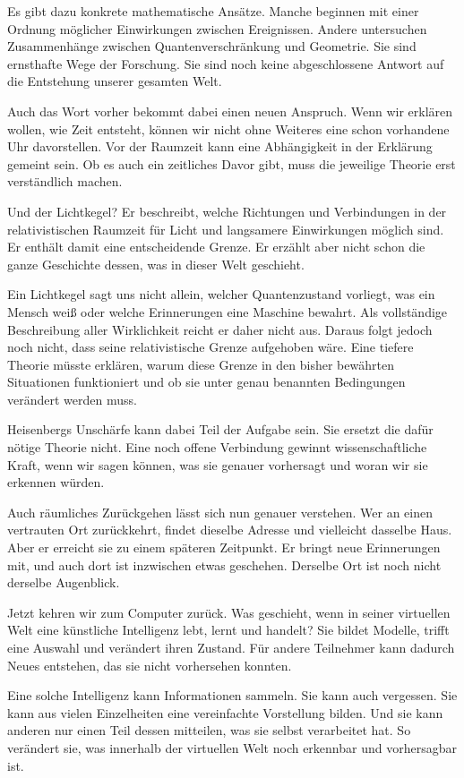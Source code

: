 Es gibt dazu konkrete mathematische Ansätze. Manche beginnen mit einer Ordnung möglicher Einwirkungen zwischen Ereignissen. Andere untersuchen Zusammenhänge zwischen Quantenverschränkung und Geometrie. Sie sind ernsthafte Wege der Forschung. Sie sind noch keine abgeschlossene Antwort auf die Entstehung unserer gesamten Welt.

Auch das Wort vorher bekommt dabei einen neuen Anspruch. Wenn wir erklären wollen, wie Zeit entsteht, können wir nicht ohne Weiteres eine schon vorhandene Uhr davorstellen. Vor der Raumzeit kann eine Abhängigkeit in der Erklärung gemeint sein. Ob es auch ein zeitliches Davor gibt, muss die jeweilige Theorie erst verständlich machen.

Und der Lichtkegel? Er beschreibt, welche Richtungen und Verbindungen in der relativistischen Raumzeit für Licht und langsamere Einwirkungen möglich sind. Er enthält damit eine entscheidende Grenze. Er erzählt aber nicht schon die ganze Geschichte dessen, was in dieser Welt geschieht.

Ein Lichtkegel sagt uns nicht allein, welcher Quantenzustand vorliegt, was ein Mensch weiß oder welche Erinnerungen eine Maschine bewahrt. Als vollständige Beschreibung aller Wirklichkeit reicht er daher nicht aus. Daraus folgt jedoch noch nicht, dass seine relativistische Grenze aufgehoben wäre. Eine tiefere Theorie müsste erklären, warum diese Grenze in den bisher bewährten Situationen funktioniert und ob sie unter genau benannten Bedingungen verändert werden muss.

Heisenbergs Unschärfe kann dabei Teil der Aufgabe sein. Sie ersetzt die dafür nötige Theorie nicht. Eine noch offene Verbindung gewinnt wissenschaftliche Kraft, wenn wir sagen können, was sie genauer vorhersagt und woran wir sie erkennen würden.

Auch räumliches Zurückgehen lässt sich nun genauer verstehen. Wer an einen vertrauten Ort zurückkehrt, findet dieselbe Adresse und vielleicht dasselbe Haus. Aber er erreicht sie zu einem späteren Zeitpunkt. Er bringt neue Erinnerungen mit, und auch dort ist inzwischen etwas geschehen. Derselbe Ort ist noch nicht derselbe Augenblick.

Jetzt kehren wir zum Computer zurück. Was geschieht, wenn in seiner virtuellen Welt eine künstliche Intelligenz lebt, lernt und handelt? Sie bildet Modelle, trifft eine Auswahl und verändert ihren Zustand. Für andere Teilnehmer kann dadurch Neues entstehen, das sie nicht vorhersehen konnten.

Eine solche Intelligenz kann Informationen sammeln. Sie kann auch vergessen. Sie kann aus vielen Einzelheiten eine vereinfachte Vorstellung bilden. Und sie kann anderen nur einen Teil dessen mitteilen, was sie selbst verarbeitet hat. So verändert sie, was innerhalb der virtuellen Welt noch erkennbar und vorhersagbar ist.

